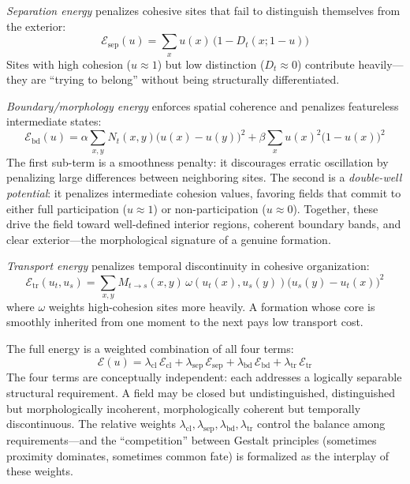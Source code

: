 \documentclass[lettersize,journal]{IEEEtran}
\begin{document}
\emph{Separation energy} penalizes cohesive sites that fail to distinguish themselves from the exterior:
\begin{equation}
\label{eq:esep}
\mathcal{E}_{\mathrm{sep}}(u) = \sum_x u(x)\,\big(1 - D_t(x; 1-u)\big)
\end{equation}
Sites with high cohesion ($u \approx 1$) but low distinction ($D_t \approx 0$) contribute heavily---they are ``trying to belong'' without being structurally differentiated.

\emph{Boundary/morphology energy} enforces spatial coherence and penalizes featureless intermediate states:
\begin{equation}
\label{eq:ebd}
\mathcal{E}_{\mathrm{bd}}(u) = \alpha \!\sum_{x,y} N_t(x,y)\big(u(x) - u(y)\big)^2 + \beta \sum_x u(x)^2\big(1 - u(x)\big)^2
\end{equation}
The first sub-term is a smoothness penalty: it discourages erratic oscillation by penalizing large differences between neighboring sites. The second is a \emph{double-well potential}: it penalizes intermediate cohesion values, favoring fields that commit to either full participation ($u \approx 1$) or non-participation ($u \approx 0$). Together, these drive the field toward well-defined interior regions, coherent boundary bands, and clear exterior---the morphological signature of a genuine formation.

\emph{Transport energy} penalizes temporal discontinuity in cohesive organization:
\begin{equation}
\label{eq:etr}
\mathcal{E}_{\mathrm{tr}}(u_t, u_s) = \!\sum_{x,y} M_{t \to s}(x,y)\,\omega(u_t(x), u_s(y))\big(u_s(y) - u_t(x)\big)^2
\end{equation}
where $\omega$ weights high-cohesion sites more heavily. A formation whose core is smoothly inherited from one moment to the next pays low transport cost.

The full energy is a weighted combination of all four terms:
\begin{equation}
\label{eq:energy}
\mathcal{E}(u) = \lambda_{\mathrm{cl}}\,\mathcal{E}_{\mathrm{cl}} + \lambda_{\mathrm{sep}}\,\mathcal{E}_{\mathrm{sep}} + \lambda_{\mathrm{bd}}\,\mathcal{E}_{\mathrm{bd}} + \lambda_{\mathrm{tr}}\,\mathcal{E}_{\mathrm{tr}}
\end{equation}
The four terms are conceptually independent: each addresses a logically separable structural requirement. A field may be closed but undistinguished, distinguished but morphologically incoherent, morphologically coherent but temporally discontinuous. The relative weights $\lambda_{\mathrm{cl}}, \lambda_{\mathrm{sep}}, \lambda_{\mathrm{bd}}, \lambda_{\mathrm{tr}}$ control the balance among requirements---and the ``competition'' between Gestalt principles (sometimes proximity dominates, sometimes common fate) is formalized as the interplay of these weights.
\end{document}
